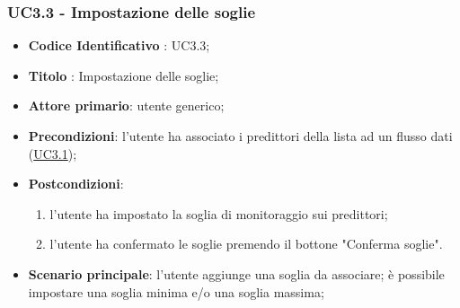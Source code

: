 	\label{par:UC3.3}
	\subsubsection{UC3.3 - Impostazione delle soglie}
		\begin{itemize}
			\item\textbf{Codice Identificativo} : UC3.3;
			\item\textbf{Titolo} : Impostazione delle soglie;
			\item\textbf{Attore primario}: utente generico;
			\item\textbf{Precondizioni}: l'utente ha associato i predittori della lista ad un flusso dati (\hyperref[par:UC3.1]{UC3.1});
			\item\textbf{Postcondizioni}: \begin{enumerate}
			\item l'utente ha impostato la soglia di monitoraggio sui predittori;
			\item l'utente ha confermato le soglie premendo il bottone "Conferma soglie".
			\end{enumerate}
			\item\textbf{Scenario principale}: l'utente aggiunge una soglia da associare; è possibile impostare una soglia minima e/o una soglia massima;
		\end{itemize}

	\label{par:UC3.4}

